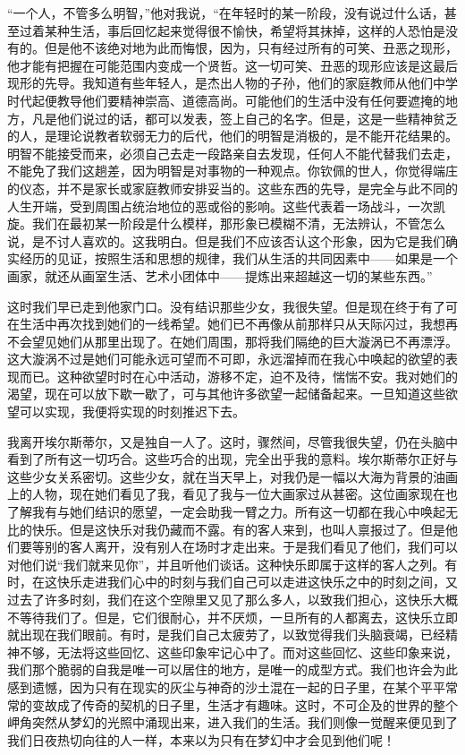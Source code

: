 \par “一个人，不管多么明智，”他对我说，“在年轻时的某一阶段，没有说过什么话，甚至过着某种生活，事后回忆起来觉得很不愉快，希望将其抹掉，这样的人恐怕是没有的。但是他不该绝对地为此而悔恨，因为，只有经过所有的可笑、丑恶之现形，他才能有把握在可能范围内变成一个贤哲。这一切可笑、丑恶的现形应该是这最后现形的先导。我知道有些年轻人，是杰出人物的子孙，他们的家庭教师从他们中学时代起便教导他们要精神崇高、道德高尚。可能他们的生活中没有任何要遮掩的地方，凡是他们说过的话，都可以发表，签上自己的名字。但是，这是一些精神贫乏的人，是理论说教者软弱无力的后代，他们的明智是消极的，是不能开花结果的。明智不能接受而来，必须自己去走一段路亲自去发现，任何人不能代替我们去走，不能免了我们这趟差，因为明智是对事物的一种观点。你钦佩的世人，你觉得端庄的仪态，并不是家长或家庭教师安排妥当的。这些东西的先导，是完全与此不同的人生开端，受到周围占统治地位的恶或俗的影响。这些代表着一场战斗，一次凯旋。我们在最初某一阶段是什么模样，那形象已模糊不清，无法辨认，不管怎么说，是不讨人喜欢的。这我明白。但是我们不应该否认这个形象，因为它是我们确实经历的见证，按照生活和思想的规律，我们从生活的共同因素中——如果是一个画家，就还从画室生活、艺术小团体中——提炼出来超越这一切的某些东西。”
\par 这时我们早已走到他家门口。没有结识那些少女，我很失望。但是现在终于有了可在生活中再次找到她们的一线希望。她们已不再像从前那样只从天际闪过，我想再不会望见她们从那里出现了。在她们周围，那将我们隔绝的巨大漩涡已不再漂浮。这大漩涡不过是她们可能永远可望而不可即，永远溜掉而在我心中唤起的欲望的表现而已。这种欲望时时在心中活动，游移不定，迫不及待，惴惴不安。我对她们的渴望，现在可以放下歇一歇了，可与其他许多欲望一起储备起来。一旦知道这些欲望可以实现，我便将实现的时刻推迟下去。
\par 我离开埃尔斯蒂尔，又是独自一人了。这时，骤然间，尽管我很失望，仍在头脑中看到了所有这一切巧合。这些巧合的出现，完全出乎我的意料。埃尔斯蒂尔正好与这些少女关系密切。这些少女，就在当天早上，对我仍是一幅以大海为背景的油画上的人物，现在她们看见了我，看见了我与一位大画家过从甚密。这位画家现在也了解我有与她们结识的愿望，一定会助我一臂之力。所有这一切都在我心中唤起无比的快乐。但是这快乐对我仍藏而不露。有的客人来到，也叫人禀报过了。但是他们要等别的客人离开，没有别人在场时才走出来。于是我们看见了他们，我们可以对他们说“我们就来见你”，并且听他们谈话。这种快乐即属于这样的客人之列。有时，在这快乐走进我们心中的时刻与我们自己可以走进这快乐之中的时刻之间，又过去了许多时刻，我们在这个空隙里又见了那么多人，以致我们担心，这快乐大概不等待我们了。但是，它们很耐心，并不厌烦，一旦所有的人都离去，这快乐立即就出现在我们眼前。有时，是我们自己太疲劳了，以致觉得我们头脑衰竭，已经精神不够，无法将这些回忆、这些印象牢记心中了。而对这些回忆、这些印象来说，我们那个脆弱的自我是唯一可以居住的地方，是唯一的成型方式。我们也许会为此感到遗憾，因为只有在现实的灰尘与神奇的沙土混在一起的日子里，在某个平平常常的变故成了传奇的契机的日子里，生活才有趣味。这时，不可企及的世界的整个岬角突然从梦幻的光照中涌现出来，进入我们的生活。我们则像一觉醒来便见到了我们日夜热切向往的人一样，本来以为只有在梦幻中才会见到他们呢！
